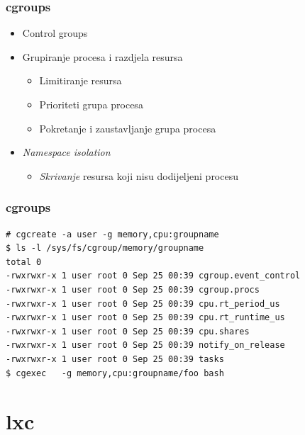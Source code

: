 \documentclass[t]{beamer}
\begin{document}
\begin{frame}
	\frametitle{cgroups}
	\begin{itemize}
		\item Control groups
	\end{itemize}
	\begin{itemize}
		\item Grupiranje procesa i razdjela resursa
		\begin{itemize}
			\item Limitiranje resursa
			\item Prioriteti grupa procesa
			\item Pokretanje i zaustavljanje grupa procesa
		\end{itemize}
		\item \emph{Namespace isolation}
		\begin{itemize}
			\item \emph{Skrivanje} resursa koji nisu dodijeljeni procesu
		\end{itemize}
	\end{itemize}
\end{frame}

\begin{frame}[fragile]
	\frametitle{cgroups}
	\scriptsize
	\begin{verbatim}
# cgcreate -a user -g memory,cpu:groupname
$ ls -l /sys/fs/cgroup/memory/groupname
total 0
-rwxrwxr-x 1 user root 0 Sep 25 00:39 cgroup.event_control
-rwxrwxr-x 1 user root 0 Sep 25 00:39 cgroup.procs
-rwxrwxr-x 1 user root 0 Sep 25 00:39 cpu.rt_period_us
-rwxrwxr-x 1 user root 0 Sep 25 00:39 cpu.rt_runtime_us
-rwxrwxr-x 1 user root 0 Sep 25 00:39 cpu.shares
-rwxrwxr-x 1 user root 0 Sep 25 00:39 notify_on_release
-rwxrwxr-x 1 user root 0 Sep 25 00:39 tasks
$ cgexec   -g memory,cpu:groupname/foo bash
	\end{verbatim}

\end{frame}



\section{lxc}
\end{document}
